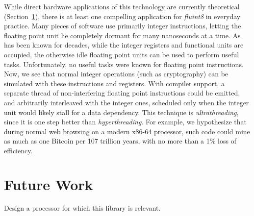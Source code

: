 \documentclass{acmsiggraph}
\theoremstyle{remark}
\theoremstyle{definition}
\begin{document}
While direct hardware applications of this technology are currently
theoretical (Section~\ref{sec:future}), there is at least one
compelling application for {\it fluint8} in everyday practice. Many
pieces of software use primarily integer instructions, letting the
floating point unit lie completely dormant for many nanoseconds at a
time. As has been known for decades, while the integer registers and
functional units are occupied, the otherwise idle floating point units
can be used to perform useful tasks. Unfortunately, no useful tasks
were known for floating point instructions. Now, we see that normal
integer operations (such as cryptography) can be simulated with these
instructions and registers. With compiler support, a separate thread
of non-interfering floating point instructions could be emitted, and
arbitrarily interleaved with the integer ones, scheduled only when the
integer unit would likely stall for a data dependency. This technique
is {\em ultrathreading}, since it is one step better than {\em
  hyperthreading}. For example, we hypothesize that during normal web
browsing on a modern x86-64 processor, such code could mine as much as
one Bitcoin per 107 trillion years, with no more than a 1\% loss of
efficiency.

\section{Future Work} \label{sec:future}

Design a processor for which this library is relevant.
\end{document}
